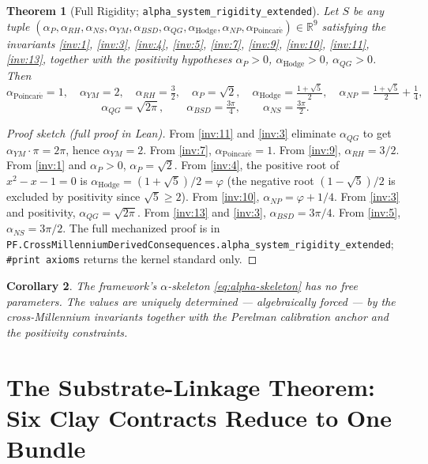 \documentclass[11pt,a4paper]{article}
\newtheorem{theorem}{Theorem}
\newtheorem{corollary}[theorem]{Corollary}
\theoremstyle{definition}
\begin{document}
\begin{theorem}[Full Rigidity;
\texttt{alpha\_system\_rigidity\_extended}]
\label{thm:rigidity}
Let $S$ be any tuple
$(\alpha_P, \alpha_{RH}, \alpha_{NS}, \alpha_{YM}, \alpha_{BSD},
\alpha_{QG}, \alpha_{\mathrm{Hodge}}, \alpha_{NP},
\alpha_{\mathrm{Poincar\acute{e}}}) \in \mathbb{R}^9$ satisfying the
invariants \eqref{inv:1}, \eqref{inv:3}, \eqref{inv:4},
\eqref{inv:5}, \eqref{inv:7}, \eqref{inv:9}, \eqref{inv:10},
\eqref{inv:11}, \eqref{inv:13}, together with the positivity
hypotheses $\alpha_P > 0$, $\alpha_{\mathrm{Hodge}} > 0$,
$\alpha_{QG} > 0$. Then
\[
\alpha_{\mathrm{Poincar\acute{e}}} = 1, \quad
\alpha_{YM} = 2, \quad
\alpha_{RH} = \tfrac{3}{2}, \quad
\alpha_P = \sqrt{2}, \quad
\alpha_{\mathrm{Hodge}} = \tfrac{1+\sqrt{5}}{2}, \quad
\alpha_{NP} = \tfrac{1+\sqrt{5}}{2} + \tfrac{1}{4},
\]
\[
\alpha_{QG} = \sqrt{2\pi}, \qquad
\alpha_{BSD} = \tfrac{3\pi}{4}, \qquad
\alpha_{NS} = \tfrac{3\pi}{2}.
\]
\end{theorem}

\begin{proof}[Proof sketch (full proof in Lean)]
From \eqref{inv:11} and \eqref{inv:3} eliminate $\alpha_{QG}$ to get
$\alpha_{YM} \cdot \pi = 2\pi$, hence $\alpha_{YM} = 2$. From
\eqref{inv:7}, $\alpha_{\mathrm{Poincar\acute{e}}} = 1$. From
\eqref{inv:9}, $\alpha_{RH} = 3/2$. From \eqref{inv:1} and
$\alpha_P > 0$, $\alpha_P = \sqrt{2}$. From \eqref{inv:4}, the
positive root of $x^2 - x - 1 = 0$ is $\alpha_{\mathrm{Hodge}} =
(1+\sqrt{5})/2 = \varphi$ (the negative root $(1-\sqrt{5})/2$ is
excluded by positivity since $\sqrt{5} \geq 2$). From \eqref{inv:10},
$\alpha_{NP} = \varphi + 1/4$. From \eqref{inv:3} and positivity,
$\alpha_{QG} = \sqrt{2\pi}$. From \eqref{inv:13} and \eqref{inv:3},
$\alpha_{BSD} = 3\pi/4$. From \eqref{inv:5}, $\alpha_{NS} = 3\pi/2$.
The full mechanized proof is in
\texttt{PF.CrossMillenniumDerivedConsequences.alpha\_system\_rigidity\_extended};
\verb|#print axioms| returns the kernel standard only.
\end{proof}

\begin{corollary}
The framework's $\alpha$-skeleton \eqref{eq:alpha-skeleton} has
\emph{no free parameters}. The values are uniquely determined ---
algebraically forced --- by the cross-Millennium invariants together
with the Perelman calibration anchor and the positivity constraints.
\end{corollary}

\section{The Substrate-Linkage Theorem: Six Clay Contracts Reduce to One Bundle}
\label{sec:linkage}
\end{document}
